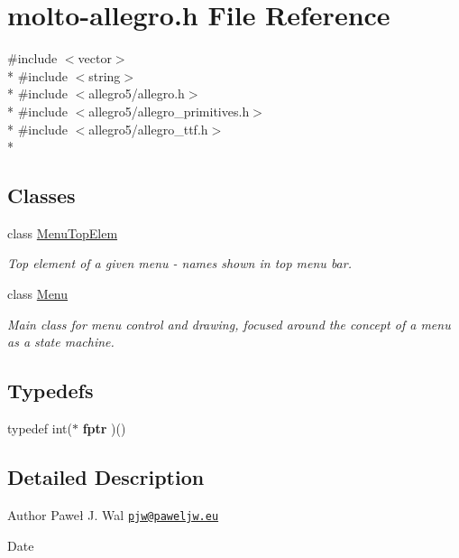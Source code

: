 \hypertarget{molto-allegro_8h}{\section{molto-\/allegro.h File Reference}
\label{molto-allegro_8h}
}
{\ttfamily \#include $<$vector$>$}\\*
{\ttfamily \#include $<$string$>$}\\*
{\ttfamily \#include $<$allegro5/allegro.\-h$>$}\\*
{\ttfamily \#include $<$allegro5/allegro\-\_\-primitives.\-h$>$}\\*
{\ttfamily \#include $<$allegro5/allegro\-\_\-ttf.\-h$>$}\\*
\subsection*{Classes}
\begin{DoxyCompactItemize}
\item 
class \hyperlink{classMenuTopElem}{Menu\-Top\-Elem}
\begin{DoxyCompactList}\small\item\em Top element of a given menu -\/ names shown in top menu bar. \end{DoxyCompactList}\item 
class \hyperlink{classMenu}{Menu}
\begin{DoxyCompactList}\small\item\em Main class for menu control and drawing, focused around the concept of a menu as a state machine. \end{DoxyCompactList}\end{DoxyCompactItemize}
\subsection*{Typedefs}
\begin{DoxyCompactItemize}
\item 
\hypertarget{molto-allegro_8h_a874c65a842ee52811812ecd6538fac6d}{typedef int($\ast$ {\bfseries fptr} )()}\label{molto-allegro_8h_a874c65a842ee52811812ecd6538fac6d}

\end{DoxyCompactItemize}


\subsection{Detailed Description}
\begin{DoxyAuthor}{Author}
Paweł J. Wal \href{mailto:pjw@paweljw.eu}{\tt pjw@paweljw.\-eu} 
\end{DoxyAuthor}
\begin{DoxyDate}{Date}

\end{DoxyDate}
